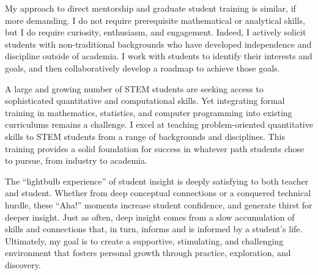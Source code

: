 \documentclass[12pt]{article}
\begin{document}
My approach to direct mentorship and graduate student
training is similar, if more demanding. I do not
require prerequisite mathematical or analytical skills,
but I do require curiosity, enthusiasm, and engagement.
Indeed, I actively solicit students with 
non-traditional backgrounds who have developed 
independence and discipline outside of academia.
I work with students to identify their interests 
and goals, and then collaboratively develop a roadmap 
to achieve those goals.

A large and growing number of STEM students are seeking
access to sophisticated quantitative and computational 
skills. Yet integrating formal training in mathematics,
statistics, and computer programming into existing
curriculums remains a challenge. I excel at  
teaching problem-oriented quantitative skills to 
STEM students from a range of backgrounds and disciplines.
This training provides a solid foundation for success 
in whatever path students chose to pursue, from industry to 
academia.

The ``lightbulb experience'' of student insight is 
deeply satisfying to both teacher and student. 
Whether from deep conceptual connections or a conquered
technical hurdle, these ``Aha!'' moments
increase student confidence, and generate thirst for 
deeper insight.  Just as often, deep insight comes 
from a slow accumulation of skills and connections that, 
in turn, informs and is informed by a student's life.  
Ultimately, my goal is to create a supportive, stimulating,
and challenging environment that fosters personal growth 
through practice, exploration, and discovery.
\end{document}
